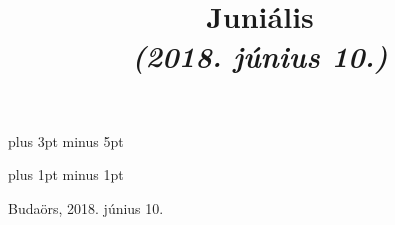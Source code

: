 \documentclass[a5paper,twoside]{article}
\title{Juniális\\\textit{(2018. június 10.)}}
\date{}
\renewcommand{\_}[1]{\underline{#1}} %
\begin{document}

  \begin{titlepage}
    \setlength{\oddsidemargin}{-1.625cm}

    \vspace*{4cm}
    {\let\newpage\relax\maketitle}
  \end{titlepage}

  \versesep=12pt plus 3pt minus 5pt

  \iflyric
    \baselineadj=2pt plus 1pt minus 1pt
  \fi


  \begin{songs}{}
    

    \renewcommand{\thesongnum}{K\arabic{songnum}}
    \setcounter{songnum}{146}
    \setlength{\songnumwidth}{1.45cm}
    

    \renewcommand{\thesongnum}{T\arabic{songnum}}
    \setlength{\songnumwidth}{1.1cm}
    

    \renewcommand{\thesongnum}{K\arabic{songnum}}
    

    \renewcommand{\thesongnum}{M\arabic{songnum}}
    \setlength{\songnumwidth}{1.25cm}
    
  \end{songs}

  \newpage
  \thispagestyle{empty}

  \vspace*{\fill}
  Budaörs, 2018. június 10.
\end{document}
